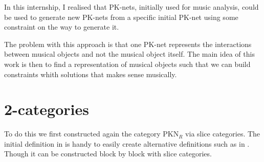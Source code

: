 In this internship, I realised that PK-nets, initially used for music analysis, could be used to generate new PK-nets from a  specific initial PK-net using some constraint on the way to generate it.

The problem with this approach is that one PK-net represents the interactions between musical objects and not the musical object itself. The main idea of this work is then to find a representation of musical objects such that we can build constraints whith solutions that makes sense musically. 


\section{2-categories}
To do this we first constructed again the category $\text{PKN}_R$ via slice categories. The initial definition in \cite{popoff2015categorical} is handy to easily create alternative definitions such as in \cite{popoff2016relational}. Though it can be constructed block by block with slice categories.


